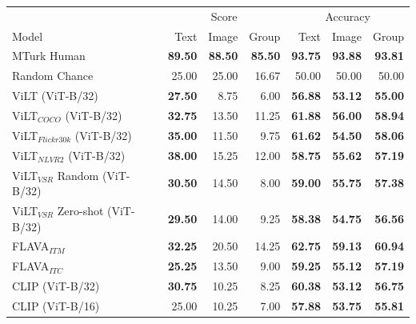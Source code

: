 \begin{table}[ht]
\centering
\begin{tabular}{l|rrr|rrr}
\toprule
 &
  \multicolumn{3}{c|}{{Score}} &
  \multicolumn{3}{c}{{Accuracy}} \\
 Model                               & Text           & Image          & Group          & Text       & Image      & Group      \\
\midrule
 MTurk Human                         & \textbf{89.50} & \textbf{88.50} & \textbf{85.50} & \textbf{93.75} & \textbf{93.88} & \textbf{93.81} \\
 Random Chance                       & 25.00          & 25.00          & 16.67          & 50.00          & 50.00          & 50.00          \\
 \midrule
 ViLT (ViT-B/32)                     & \textbf{27.50} & 8.75           & 6.00           & \textbf{56.88} & \textbf{53.12} & \textbf{55.00} \\
 ViLT$_{COCO}$ (ViT-B/32)            & \textbf{32.75} & 13.50          & 11.25          & \textbf{61.88} & \textbf{56.00} & \textbf{58.94} \\
 ViLT$_{Flickr30k}$ (ViT-B/32)       & \textbf{35.00} & 11.50          & 9.75           & \textbf{61.62} & \textbf{54.50} & \textbf{58.06} \\
 ViLT$_{NLVR2}$ (ViT-B/32)           & \textbf{38.00} & 15.25          & 12.00          & \textbf{58.75} & \textbf{55.62} & \textbf{57.19} \\
 ViLT$_{VSR}$ Random (ViT-B/32)      & \textbf{30.50} & 14.50          & 8.00           & \textbf{59.00} & \textbf{55.75} & \textbf{57.38} \\
 ViLT$_{VSR}$ Zero-shot (ViT-B/32)   & \textbf{29.50} & 14.00          & 9.25           & \textbf{58.38} & \textbf{54.75} & \textbf{56.56} \\
 FLAVA$_{ITM}$                       & \textbf{32.25} & 20.50          & 14.25          & \textbf{62.75} & \textbf{59.13} & \textbf{60.94} \\
 FLAVA$_{ITC}$                       & \textbf{25.25} & 13.50          & 9.00           & \textbf{59.25} & \textbf{55.12} & \textbf{57.19} \\
 CLIP (ViT-B/32)                     & \textbf{30.75} & 10.25          & 8.25           & \textbf{60.38} & \textbf{53.12} & \textbf{56.75} \\
 CLIP (ViT-B/16)                     & 25.00          & 10.25          & 7.00           & \textbf{57.88} & \textbf{53.75} & \textbf{55.81} \\

\end{tabular}
\end{table}

